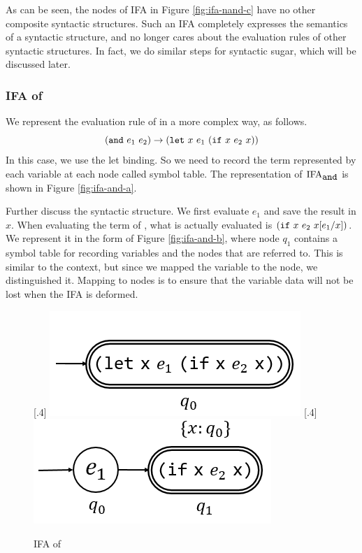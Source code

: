 As can be seen, the nodes of IFA in Figure \ref{fig:ifa-nand-c} have no other composite syntactic structures. Such an IFA completely expresses the semantics of a syntactic structure, and no longer cares about the evaluation rules of other syntactic structures. In fact, we do similar steps for syntactic sugar, which will be discussed later.

\subsubsection{IFA of }

We represent the evaluation rule of  in a more complex way, as follows. 
\[
(\mbox{\tt and}~e_1~e_2) \to (\mbox{\tt let}~x~e_1~(\mbox{\tt if}~x~e_2~x))
\]
In this case, we use the let binding. So we need to record the term represented by each variable at each node called symbol table. The representation of $\text{IFA}_{\mbox{\tt and}}$ is shown in Figure \ref{fig:ifa-and-a}. 

Further discuss the syntactic structure. We first evaluate $e_1$ and save the result in $x$. When evaluating the term of , what is actually evaluated is $(\mbox{\tt if}~x~e_2~x[e_1/x])$. We represent it in the form of Figure \ref{fig:ifa-and-b}, where node $q_1$ contains a symbol table for recording variables and the nodes that are referred to. This is similar to the context, but since we mapped the variable to the node, we distinguished it. Mapping to nodes is to ensure that the variable data will not be lost when the IFA is deformed.

\begin{figure}[t]
\centering
{}[.4\linewidth]{
    \includegraphics[scale=0.25]{images/ifa/ifa-and-1.png}
}
[.4\linewidth]{
    \includegraphics[scale=0.25]{images/ifa/ifa-and-2.png}
}
\caption{IFA of }
\label{fig:ifa-and}
\end{figure}

